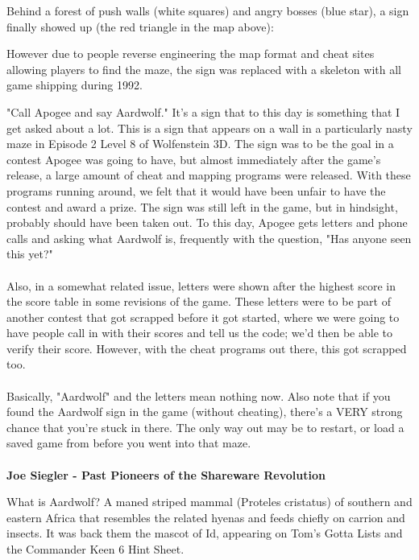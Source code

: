 \par
Behind a forest of push walls (white squares) and angry bosses (blue star), a sign finally showed up (the red triangle in the map above):\\
\par

\begin{figure}[H]
  \centering
\end{figure}
\par
However due to people reverse engineering the map format and cheat sites allowing players to find the maze, the sign was replaced with a skeleton with all game shipping during 1992.
\par
\begin{fancyquotes}
"Call Apogee and say Aardwolf."  It's a sign that to this day is something
that I get asked about a lot.  This is a sign that appears on a wall in a
particularly nasty maze in Episode 2 Level 8 of Wolfenstein 3D.  The sign
was to be the goal in a contest Apogee was going to have, but almost
immediately after the game's release, a large amount of cheat and mapping
programs were released.  With these programs running around, we felt that
it would have been unfair to have the contest and award a prize.  The sign
was still left in the game, but in hindsight, probably should have been
taken out.  To this day, Apogee gets letters and phone calls and asking
what Aardwolf is, frequently with the question, "Has anyone seen this yet?"\\
\\
Also, in a somewhat related issue, letters were shown after the highest score
in the score table in some revisions of the game.  These letters were to be
part of another contest that got scrapped before it got started, where we were
going to have people call in with their scores and tell us the code; we'd then
be able to verify their score.  However, with the cheat programs out there,
this got scrapped too.\\
\\
Basically, "Aardwolf" and the letters mean nothing now.  Also note that if
you found the Aardwolf sign in the game (without cheating), there's a VERY
strong chance that you're stuck in there.  The only way out may be to restart,
or load a saved game from before you went into that maze.\\
\\
\textbf{Joe Siegler - Past Pioneers of the Shareware Revolution}
\end{fancyquotes}
\par
{} What is Aardwolf? A maned striped mammal (Proteles cristatus) of southern and eastern Africa that resembles the related hyenas and feeds chiefly on carrion and insects. It was back them the mascot of Id, appearing on Tom's Gotta Lists and the Commander Keen 6 Hint Sheet.














